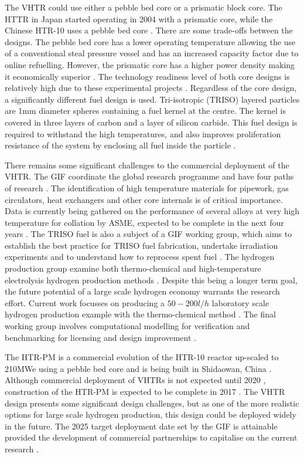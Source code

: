 \documentclass[journal]{IEEEtran}
\begin{document}
The VHTR could use either a pebble bed core or a prismatic block core.
The HTTR in Japan started operating in 2004 with a prismatic core, while the Chinese HTR-10 uses a pebble bed core \cite{Ftterer2014}.
There are some trade-offs between the designs.
The pebble bed core has a lower operating temperature allowing the use of a conventional steal pressure vessel and has an increased capacity factor due to online refuelling.
However, the prismatic core has a higher power density making it economically superior \cite{Locatelli2013}.
The technology readiness level of both core designs is relatively high due to these experimental projects \cite{Ftterer2014}.
Regardless of the core design, a significantly different fuel design is used.
Tri-isotropic (TRISO) layered particles are 1mm diameter spheres containing a fuel kernel at the centre.
The kernel is covered in three layers of carbon and a layer of silicon carbide.
This fuel design is required to withstand the high temperatures, and also improves proliferation resistance of the system by enclosing all fuel inside the particle \cite{Marques2010a}.

There remains some significant challenges to the commercial deployment of the VHTR. 
The GIF coordinate the global research programme and have four paths of research \cite{GenIVForum}.
The identification of high temperature materials for pipework, gas circulators, heat exchangers and other core internals is of critical importance. 
Data is currently being gathered on the performance of several alloys at very high temperature for collation by ASME, expected to be complete in the next four years \cite{Ftterer2014}.
The TRISO fuel is also a subject of a GIF working group, which aims to establish the best practice for TRISO fuel fabrication, undertake irradiation experiments \cite{Ftterer2014} and to understand how to reprocess spent fuel \cite{GenIVForum}. 
The hydrogen production group examine both thermo-chemical and high-temperature electrolysis hydrogen production methods \cite{GenIVForum}.
Despite this being a longer term goal, the future potential of a large scale hydrogen economy warrants the research effort.
Current work focusses on producing a $50-200l/h$ laboratory scale hydrogen production example with the thermo-chemical method \cite{Ftterer2014}.
The final working group involves computational modelling for verification and benchmarking for licensing and design improvement \cite{GenIVForum}.

The HTR-PM is a commercial evolution of the HTR-10 reactor up-scaled to 210MWe using a pebble bed core and is being built in Shidaowan, China \cite{Locatelli2013}.
Although commercial deployment of VHTRs is not expected until 2020 \cite{GenIVRoadmap}, construction of the HTR-PM is expected to be complete in 2017 \cite{Ftterer2014}. 
The VHTR design presents some significant design challenges, but as one of the more realistic options for large scale hydrogen production, this design could be deployed widely in the future.
The 2025 target deployment date set by the GIF \cite{GenIVRoadmap} is attainable provided the development of commercial partnerships to capitalise on the current research \cite{Ftterer2014}.
\end{document}
